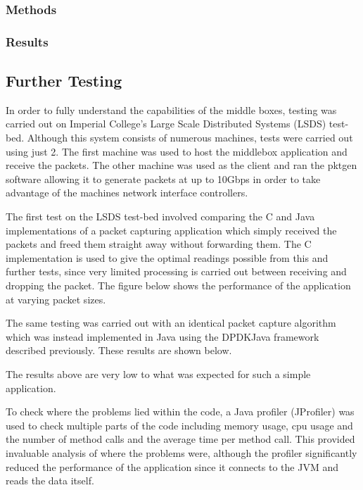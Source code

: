 \documentclass[final_report.tex]{subfiles}
\begin{document}
\subsubsection{Methods}

\subsubsection{Results}

\subsection{Further Testing}
In order to fully understand the capabilities of the middle boxes, testing was carried out on Imperial College's Large Scale Distributed Systems (LSDS) test-bed. Although this system consists of numerous machines, tests were carried out using just 2. The first machine was used to host the middlebox application and receive the packets. The other machine was used as the client and ran the pktgen software allowing it to generate packets at up to 10Gbps in order to take advantage of the machines network interface controllers.

The first test on the LSDS test-bed involved comparing the C and Java implementations of a packet capturing application which simply received the packets and freed them straight away without forwarding them. The C implementation is used to give the optimal readings possible from this and further tests, since very limited processing is carried out between receiving and dropping the packet. The figure below shows the performance of the application at varying packet sizes.



The same testing was carried out with an identical packet capture algorithm which was instead implemented in Java using the DPDKJava framework described previously. These results are shown below.


The results above are very low to what was expected for such a simple application. 

To check where the problems lied within the code, a Java profiler (JProfiler) was used to check multiple parts of the code including memory usage, cpu usage and the number of method calls and the average time per method call. This provided invaluable analysis of where the problems were, although the profiler significantly reduced the performance of the application since it connects to the JVM and reads the data itself.
\end{document}
